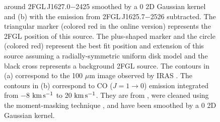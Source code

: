 \begin{figure}
{  around 2FGL\,J1627.0$-$2425 smoothed by a 0 2D Gaussian kernel and (b)
  with the emission from 2FGL\,J1625.7$-$2526
  subtracted.  The triangular marker 
  (colored red in the
  online version) represents the 2FGL position of this source.
  The plus-shaped marker and the circle (colored red) 
  represent the best fit position and extension of this
  source assuming a radially-symmetric uniform disk model
  and the black cross represents a background 2FGL source. 
  The
  contours in (a) correspond to the 100 $\mu$m image observed by
  IRAS \citep{young_1986a_high-resolution-observations}.  The contours in (b) correspond to
  CO ($J=1\rightarrow 0$) emission integrated from $-$8 $\text{km}\,\text{s}^{-1}$
  to 20 $\text{km}\,\text{s}^{-1}$.  They are from \cite{de-geus_1990a_survey-clouds}, were cleaned using
  the moment-masking technique \citep{dame_2011a_optimization-moment}, and have
  been smoothed by a 0 2D Gaussian kernel.
  }
\end{figure}

